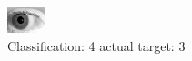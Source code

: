 \begin{figure}[h!]
\begin{center}
\includegraphics[width=0.60\columnwidth]{figures/ID190_class_4_target_3.png}
\end{center}
\caption{ Classification: 4 actual target: 3}
\label{fig:ID190_class_4_target_3}
\end{figure}
